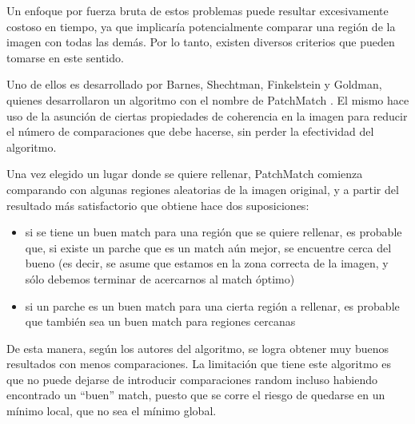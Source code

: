 \documentclass[assd_tpf_main.tex]{subfiles}
\begin{document}
Un enfoque por fuerza bruta de estos problemas puede resultar excesivamente costoso en tiempo, ya que implicar\'ia potencialmente comparar una regi\'on de la imagen con todas las dem\'as. Por lo tanto, existen diversos criterios que pueden tomarse en este sentido.

Uno de ellos es desarrollado por Barnes, Shechtman, Finkelstein y Goldman, quienes desarrollaron un algoritmo con el nombre de PatchMatch \cite{patchmatch}.  El mismo
hace uso de la asunci\'on de ciertas propiedades de coherencia en la imagen para reducir
el n\'umero de comparaciones que debe hacerse, sin perder la efectividad del algoritmo.
 
Una vez elegido un lugar donde se quiere rellenar, PatchMatch comienza comparando con algunas regiones aleatorias de la imagen original, y a partir del resultado m\'as satisfactorio que obtiene hace dos suposiciones:
\begin{itemize}
	\item si se tiene un buen match para una regi\'on que se quiere rellenar, es probable 
	que, si existe un parche que es un match a\'un mejor, se encuentre cerca del bueno (es
	decir, se asume que estamos en la zona correcta de la imagen, y s\'olo debemos
	terminar de acercarnos al match \'optimo)
	\item si un parche es un buen match para una cierta regi\'on a rellenar, es probable que
	tambi\'en sea un buen match para regiones cercanas
\end{itemize}

De esta manera, seg\'un los autores del algoritmo, se logra obtener muy buenos resultados con menos comparaciones. La limitaci\'on que tiene este algoritmo es que no puede dejarse
de introducir comparaciones random incluso habiendo encontrado un ``buen'' match,
puesto que se corre el riesgo de quedarse en un m\'inimo local, que no sea el m\'inimo
global.
\end{document}
